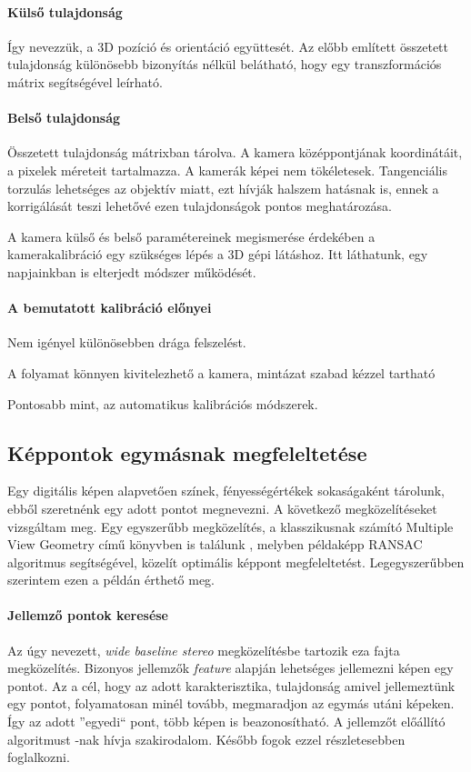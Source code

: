 \documentclass[12pt,a4paper,oneside]{report} %
\begin{document}
\paragraph{Külső tulajdonság} Így nevezzük, a 3D pozíció és  orientáció együttesét. Az előbb említett összetett  tulajdonság különösebb bizonyítás nélkül belátható, hogy egy transzformációs mátrix segítségével leírható.
\paragraph{Belső tulajdonság} 
Összetett tulajdonság mátrixban tárolva. A kamera középpontjának koordinátáit, a pixelek méreteit tartalmazza.  A kamerák képei nem tökéletesek. Tangenciális torzulás lehetséges az objektív miatt, ezt hívják halszem hatásnak is, ennek a korrigálását teszi lehetővé ezen tulajdonságok pontos meghatározása. 
\par  A kamera külső és belső paramétereinek megismerése érdekében a kamerakalibráció egy szükséges lépés a 3D gépi látáshoz. Itt \cite{zhang1999flexible} láthatunk, egy  napjainkban is elterjedt módszer működését.
\paragraph{A bemutatott kalibráció előnyei} 
\begin{compactitem}
	\item Nem igényel különösebben drága felszelést. 
	\item A folyamat könnyen kivitelezhető a kamera, mintázat szabad kézzel tartható 
	\item Pontosabb mint, az automatikus kalibrációs módszerek.
\end{compactitem}

\subsection{Képpontok egymásnak megfeleltetése}
Egy digitális képen alapvetően színek, fényességértékek sokaságaként tárolunk, ebből szeretnénk egy adott pontot megnevezni. A következő megközelítéseket vizsgáltam meg. Egy egyszerűbb megközelítés, a klasszikusnak számító Multiple View Geometry című könyvben is találunk \cite[ó.~140]{hartley2003multiple}, melyben példaképp RANSAC \cite{derpanis2010overview} algoritmus segítségével, közelít optimális képpont megfeleltetést. Legegyszerűbben szerintem ezen a példán érthető meg.

\paragraph{Jellemző pontok keresése}
Az úgy nevezett, \textit{wide baseline stereo} megközelítésbe tartozik eza fajta megközelítés.
Bizonyos jellemzők \textit{feature} alapján lehetséges jellemezni képen egy pontot. Az a cél, hogy az adott karakterisztika, tulajdonság amivel jellemeztünk egy pontot, folyamatosan minél tovább, megmaradjon az egymás utáni képeken. Így az adott ''egyedi`` pont, több képen is beazonosítható. A jellemzőt előállító algoritmust -nak hívja szakirodalom. Később fogok  ezzel részletesebben foglalkozni.
\end{document}
